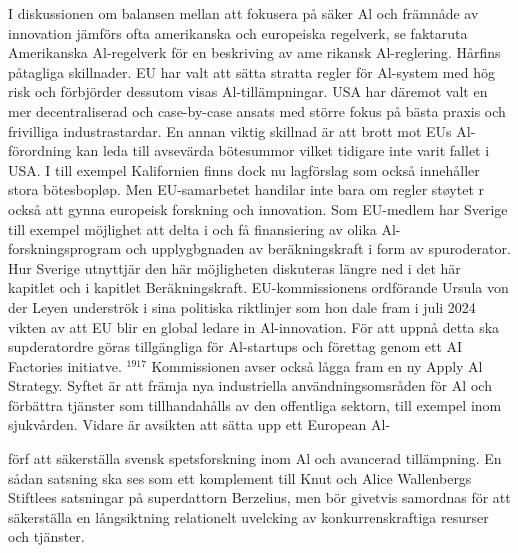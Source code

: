 {{{{{I diskussionen om balansen mellan att fokusera på säker Al och främnåde av innovation jämförs ofta amerikanska och europeiska regelverk, se faktaruta Amerikanska Al-regelverk för en beskriving av ame rikansk Al-reglering. Hårfins påtagliga skillnader. EU har valt att sätta stratta regler för Al-system med hög risk och förbjörder dessutom visas Al-tillämpningar. USA har däremot valt en mer decentraliserad och case-by-case ansats med större fokus på bästa praxis och frivilliga industrastardar. En annan viktig skillnad är att brott mot EUs Al-förordning kan leda till avsevärda bötesummor vilket tidigare inte varit fallet i USA. I till exempel Kalifornien finns dock nu lagförslag som också innehåller stora bötesbopløp.
Men EU-samarbetet handilar inte bara om regler støytet r också att gynna europeisk forskning och innovation. Som EU-medlem har Sverige till exempel möjlighet att delta i och få finansiering av olika Al-forskningsprogram och upplygbgnaden av beräkningskraft i form av spuroderator. Hur Sverige utnyttjär den här möjligheten diskuteras längre ned i det här kapitlet och i kapitlet Beräkningskraft.
EU-kommissionens ordförande Ursula von der Leyen underströk i sina politiska riktlinjer som hon dale fram i juli 2024 vikten av att EU blir en global ledare in Al-innovation. För att uppnå detta ska supderatordre göras tillgängliga för Al-startups och förettag genom ett AI Factories initiatve. \({ }^{1917}\) Kommissionen avser också lågga fram en ny Apply Al Strategy. Syftet är att främja nya industriella användningsomsråden för Al och förbättra tjänster som tillhandahålls av den offentliga sektorn, till exempel inom sjukvården. Vidare är avsikten att sätta upp ett European Al-

förf att säkerställa svensk spetsforskning inom Al och avancerad tillämpning. En sådan satsning ska ses som ett komplement till Knut och Alice Wallenbergs Stiftlees satsningar på superdattorn Berzelius, men bör givetvis samordnas för att säkerställa en långsiktning relationelt uvelcking av konkurrenskraftiga resurser och tjänster.
}}}}}
